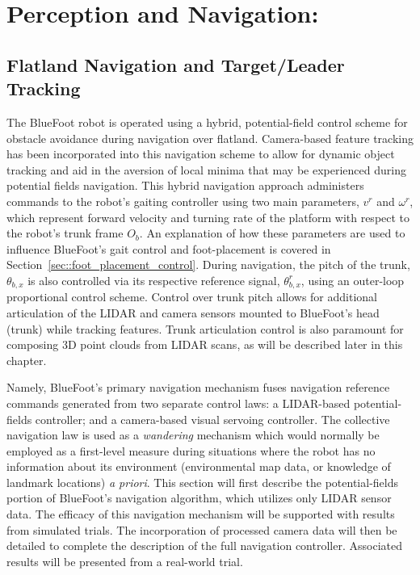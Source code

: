\chapter{Perception and Navigation:}
\label{ch::navigation}


	\section{Flatland Navigation and Target/Leader Tracking}
	
		The BlueFoot robot is operated using a hybrid, potential-field control scheme for obstacle avoidance during navigation over flatland. Camera-based feature tracking has been incorporated into this navigation scheme to allow for dynamic object tracking and aid in the aversion of local minima that may be experienced during potential fields navigation. This hybrid navigation approach administers commands to the robot's gaiting controller using two main parameters, $v^{r}$ and $\omega^{r}$, which represent forward velocity and turning rate of the platform with respect to the robot's trunk frame $O_{b}$. An explanation of how these parameters are used to influence BlueFoot's gait control and foot-placement is covered in Section~\ref{sec::foot_placement_control}. During navigation, the pitch of the trunk, $\theta_{b,x}$ is also controlled via its respective reference signal, $\theta_{b,x}^{r}$, using an outer-loop proportional control scheme. Control over trunk pitch allows for additional articulation of the LIDAR and camera sensors mounted to BlueFoot's head (trunk) while tracking features. Trunk articulation control is also paramount for composing 3D point clouds from LIDAR scans, as will be described later in this chapter.

		Namely, BlueFoot's primary navigation mechanism fuses navigation reference commands generated from two separate control laws: a LIDAR-based potential-fields controller; and a camera-based visual servoing controller. The collective navigation law is used as a \emph{wandering} mechanism which would normally be employed as a first-level measure during situations where the robot has no information about its environment (\IE environmental map data, or knowledge of landmark locations) \emph{a priori}. This section will first describe the potential-fields portion of BlueFoot's navigation algorithm, which utilizes only LIDAR sensor data. The efficacy of this navigation mechanism will be supported with results from simulated trials. The incorporation of processed camera data will then be detailed to complete the description of the full navigation controller. Associated results will be presented from a real-world trial.


